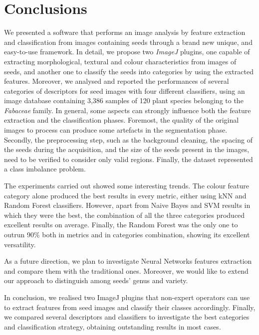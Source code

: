 \section{Conclusions}
We presented a software that performs an image analysis by feature extraction and classification from images containing seeds through a brand new unique, and easy-to-use framework. In detail, we propose two \emph{ImageJ} plugins, one capable of extracting morphological, textural and colour characteristics from images of seeds, and another one to classify the seeds into categories by using the extracted features. 
Moreover, we analysed and reported the performances of several categories of descriptors for seed images with four different classifiers, using an image database containing 3,386 samples of 120 plant species belonging to the \emph{Fabaceae} family. 
In general, some aspects can strongly influence both the feature extraction and the classification phases. Foremost, the quality of the original images to process can produce some artefacts in the segmentation phase. Secondly, the preprocessing step, such as the background cleaning, the spacing of the seeds during the acquisition, and the size of the seeds present in the images, need to be verified to consider only valid regions. Finally, the dataset represented a class imbalance problem.

The experiments carried out showed some interesting trends. The colour feature category alone produced the best results in every metric, either using kNN and Random Forest classifiers. However, apart from Naive Bayes and SVM results in which they were the best, the combination of all the three categories produced excellent results on average. Finally, the Random Forest was the only one to outrun 90\% both in metrics and in categories combination, showing its excellent versatility.

As a future direction, we plan to investigate Neural Networks features extraction and compare them with the traditional ones. Moreover, we would like to extend our approach to distinguish among seeds' genus and variety.

In conclusion, we realised two ImageJ plugins that non-expert operators can use to extract features from seed images and classify their classes accordingly. Finally, we compared several descriptors and classifiers to investigate the best categories and classification strategy, obtaining outstanding results in most cases.
